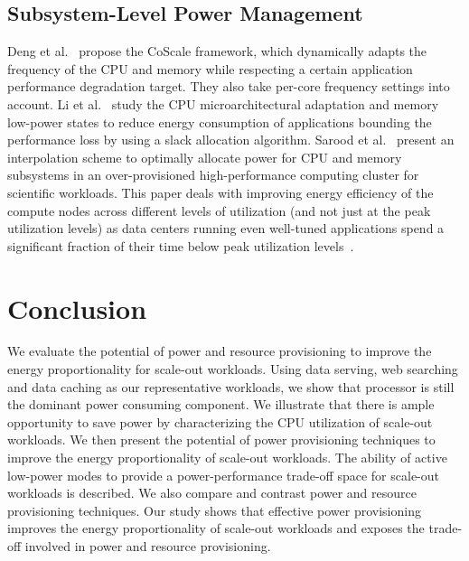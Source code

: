 \documentclass{sig-alternate}
\begin{document}
\subsection{Subsystem-Level Power Management} 

Deng et al.~\cite{coscale, memscale} 
propose the CoScale framework, which dynamically adapts the frequency of the CPU and memory 
while respecting a certain application performance degradation target.  They
also take per-core frequency settings into account. Li et
al.~\cite{crosscomponent} study the CPU microarchitectural adaptation
and memory low-power states to reduce energy consumption of
applications bounding the performance loss by using a slack allocation
algorithm.  Sarood et al.~\cite{hpc_rapl} present an interpolation
scheme to optimally allocate power for CPU and memory subsystems in an
over-provisioned high-performance computing cluster for scientific
workloads.  This paper deals with improving energy efficiency of the
compute nodes across different levels of utilization (and not just at
the peak utilization levels) as data centers running even well-tuned
applications spend a significant fraction of their time below peak
utilization levels~\cite{eprop,bubbleup,provisioning}.
 \section{Conclusion}
\label{sec:conclusion}

We evaluate the potential of power and resource provisioning to improve the 
energy proportionality for scale-out workloads. Using data serving, 
web searching and data caching as our representative workloads, we show 
that processor is still the dominant power consuming component. We 
illustrate that there is ample opportunity to save power by characterizing 
the CPU utilization of scale-out workloads. We then present 
the potential of power provisioning techniques 
to improve the energy proportionality of scale-out workloads. 
The ability of active low-power modes to provide a power-performance 
trade-off space for scale-out workloads is described. We also compare and contrast power 
and resource provisioning techniques. Our study shows that effective power 
provisioning improves the energy proportionality of scale-out workloads and 
exposes the trade-off involved in power and resource provisioning. 
 
	

\end{document}
